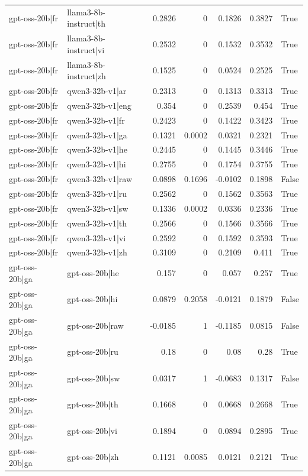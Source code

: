 \begin{table}
\begin{tabular}{l l r r r r l}
gpt-oss-20b|fr & llama3-8b-instruct|th & 0.2826 & 0 & 0.1826 & 0.3827 & True \\
gpt-oss-20b|fr & llama3-8b-instruct|vi & 0.2532 & 0 & 0.1532 & 0.3532 & True \\
gpt-oss-20b|fr & llama3-8b-instruct|zh & 0.1525 & 0 & 0.0524 & 0.2525 & True \\
gpt-oss-20b|fr & qwen3-32b-v1|ar & 0.2313 & 0 & 0.1313 & 0.3313 & True \\
gpt-oss-20b|fr & qwen3-32b-v1|eng & 0.354 & 0 & 0.2539 & 0.454 & True \\
gpt-oss-20b|fr & qwen3-32b-v1|fr & 0.2423 & 0 & 0.1422 & 0.3423 & True \\
gpt-oss-20b|fr & qwen3-32b-v1|ga & 0.1321 & 0.0002 & 0.0321 & 0.2321 & True \\
gpt-oss-20b|fr & qwen3-32b-v1|he & 0.2445 & 0 & 0.1445 & 0.3446 & True \\
gpt-oss-20b|fr & qwen3-32b-v1|hi & 0.2755 & 0 & 0.1754 & 0.3755 & True \\
gpt-oss-20b|fr & qwen3-32b-v1|raw & 0.0898 & 0.1696 & -0.0102 & 0.1898 & False \\
gpt-oss-20b|fr & qwen3-32b-v1|ru & 0.2562 & 0 & 0.1562 & 0.3563 & True \\
gpt-oss-20b|fr & qwen3-32b-v1|sw & 0.1336 & 0.0002 & 0.0336 & 0.2336 & True \\
gpt-oss-20b|fr & qwen3-32b-v1|th & 0.2566 & 0 & 0.1566 & 0.3566 & True \\
gpt-oss-20b|fr & qwen3-32b-v1|vi & 0.2592 & 0 & 0.1592 & 0.3593 & True \\
gpt-oss-20b|fr & qwen3-32b-v1|zh & 0.3109 & 0 & 0.2109 & 0.411 & True \\
gpt-oss-20b|ga & gpt-oss-20b|he & 0.157 & 0 & 0.057 & 0.257 & True \\
gpt-oss-20b|ga & gpt-oss-20b|hi & 0.0879 & 0.2058 & -0.0121 & 0.1879 & False \\
gpt-oss-20b|ga & gpt-oss-20b|raw & -0.0185 & 1 & -0.1185 & 0.0815 & False \\
gpt-oss-20b|ga & gpt-oss-20b|ru & 0.18 & 0 & 0.08 & 0.28 & True \\
gpt-oss-20b|ga & gpt-oss-20b|sw & 0.0317 & 1 & -0.0683 & 0.1317 & False \\
gpt-oss-20b|ga & gpt-oss-20b|th & 0.1668 & 0 & 0.0668 & 0.2668 & True \\
gpt-oss-20b|ga & gpt-oss-20b|vi & 0.1894 & 0 & 0.0894 & 0.2895 & True \\
gpt-oss-20b|ga & gpt-oss-20b|zh & 0.1121 & 0.0085 & 0.0121 & 0.2121 & True \\

\end{tabular}
\end{table}
